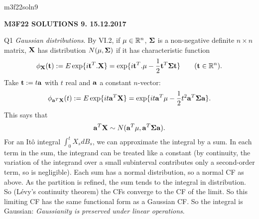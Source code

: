 \documentclass[12pt]{article}
\begin{document}
\def\R{\mathbb{R}}
\def\C{\mathbb{C}}
\def\Z{\mathbb{Z}}
\def\N{\mathbb{N}}
\def\Q{\mathbb{Q}}
\def\D{\mathbb{D}}
\def\Sp{{\mathbb{S}}}
\def\T{\mathbb{T}}
\def\H{\mathbb{H}}
\def\hb{\hfil \break}
\def\ni{\noindent}
\def\i{\indent}
\def\a{\alpha}
\def\b{\beta}
\def\e{\epsilon}
\def\d{\delta}
\def\D{\Delta}
\def\G{\Gamma}
\def\g{\gamma}
\def\l{\lambda}
\def\m{\mu}
\def\s{\sigma}
\def\Si{\Sigma}
\def\th{\theta}
\def\z{\zeta}
\def\p{\phi}
\def\o{\omega}
\def\O{\Omega}
\def\t{\tau}
\def\L{\it \char'44}
\def\F{\mathcal{F}}
\def\B{\mathcal{B}}
\def\C{\mathcal{C}}
\def\half{\frac{1}{2}}
\def\qq{\qquad}
\def\ti{\tilde}
\ni m3f22soln9 \\
\begin{center}
{\bf M3F22 SOLUTIONS 9.  15.12.2017} 
\end{center}

\ni Q1 {\it Gaussian distributions}.  By VI.2, if
${\bf \mu} \in {\R}^n$, ${\bf \Si}$ is a non-negative definite $n
\times n$ matrix, ${\bf X}$ has distribution $N({\bf \mu}, {\bf \Si})$
if it has characteristic function
$$
{\phi}_{\bf X} ({\bf t})
:= E \exp \{i {\bf t}^T .{\bf X} \}
= \exp \{ i {\bf t}^T .{\bf \mu} - \half {\bf t}^T {\bf \Si} {\bf t} \} \qquad ({\bf t} \in {\R}^n).
$$
Take ${\bf t} := t {\bf a}$ with $t$ real and ${\bf a}$ a constant $n$-vector:
$$
{\phi}_{{\bf a}^T {\bf X}} (t)
:= E \exp \{i t {\bf a}^T {\bf X} \}
= \exp \{ i t {\bf a}^T {\bf \mu} - \half t^2 {\bf a}^T {\bf \Si} {\bf a} \}.
$$
This says that
$$
{\bf a}^T {\bf X} \sim N({\bf a}^T {\bf \mu}, {\bf a}^T {\bf \Sigma} {\bf a}).
$$
\i For an It\^o integral $\int_0^t X_s dB_s$, we can approximate the integral by a sum.
In each term in the sum, the integrand can be treated like a constant (by continuity, the variation of the integrand over a small subinterval contributes only a second-order term, so is
negligible).  Each sum has a normal distribution, so a normal CF as above.  As the partition is refined, the sum tends to the integral in distribution.  So (L\'evy's continuity theorem) the
CFs converge to the CF of the limit.  So this limiting CF has the same functional form as a Gaussian CF.  So the integral is Gaussian: {\it Gaussianity is preserved under linear operations}. \\
\end{document}
